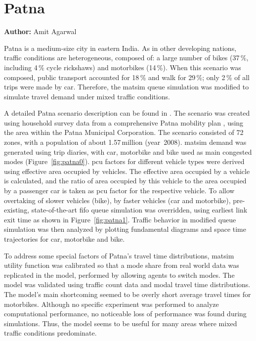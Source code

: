 \chapter{Patna}
\label{ch:patna}
\hfill \textbf{Author:} Amit Agarwal


Patna is a medium-size city in eastern India. As in other developing nations, traffic conditions are heterogeneous, composed of: a large number of bikes (37\,\%, including 4\,\% cycle rickshaws) and motorbikes (14\,\%). When this scenario was composed, public transport accounted for 18\,\% and walk for 29\,\%; only 2\,\% of all trips were made by car. Therefore, the \gls{matsim} queue simulation was modified to simulate travel demand under mixed traffic conditions.

A detailed Patna scenario description can be found in \citet[][]{AgarwalEtcMixedTraffic}. The scenario was created using household survey data from a comprehensive Patna mobility plan \citep[][]{TrippItransVks2009PatnaReport}, using the area within the Patna Municipal Corporation. The scenario consisted of 72\,zones, with a population of about 1.57\,million (year~2008). \gls{matsim} demand was generated using trip diaries, with car, motorbike and bike used as main congested modes (Figure~\ref{fig:patna0}). \gls{pcu} factors for different vehicle types were derived using effective area occupied by vehicles. The effective area occupied by a vehicle is calculated, and the ratio of area occupied by this vehicle to the area occupied by a passenger car is taken as \gls{pcu} factor for the respective vehicle.
To allow overtaking of slower vehicles (bike), by faster vehicles (car and motorbike), pre-existing, state-of-the-art \gls{fifo} queue simulation was overridden, using earliest link exit time as shown in Figure~\ref{fig:patna1}. Traffic behavior in modified queue simulation was then analyzed by plotting fundamental diagrams and space time trajectories for car, motorbike and bike.

To address some special factors of Patna's travel time distributions, \gls{matsim} utility function was calibrated so that a mode share from real world data was replicated in the model, performed by allowing agents to switch modes. The model was validated using traffic count data and modal travel time distributions. The model's main shortcoming seemed to be overly short average travel times for motorbikes. Although no specific experiment was performed to analyze computational performance, no noticeable loss of performance was found during simulations. Thus, the model seems to be useful for many areas where mixed traffic conditions predominate.

